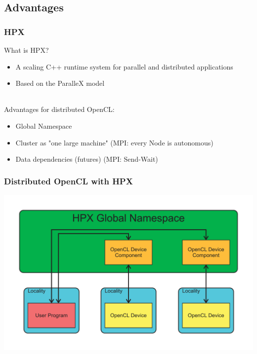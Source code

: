 \documentclass{beamer}
\begin{document}
\subsection{Advantages}
\begin{frame}
    \frametitle{HPX}
    What is HPX?
    \begin{itemize}
        \item A scaling C++ runtime system for parallel and distributed applications
        \item Based on the ParalleX model
    \end{itemize}
    ~\\
    Advantages for distributed OpenCL:
    \begin{itemize}
        \item Global Namespace
        \item Cluster as "one large machine" (MPI: every Node is autonomous)
        \item Data dependencies (futures) (MPI: Send-Wait)
    \end{itemize}
\end{frame}

\begin{frame}
    \frametitle{Distributed OpenCL with HPX}
    \includegraphics[width=\textwidth]{../2014-09-25_gputalk/hpx_opencl.pdf}
\end{frame}
\end{document}
